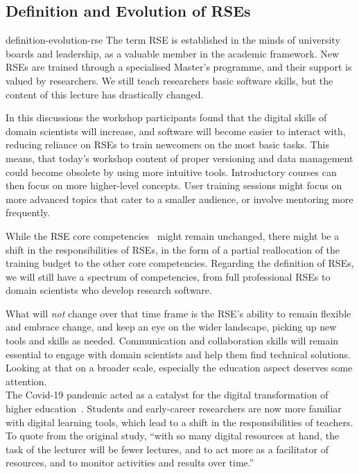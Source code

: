 \documentclass{eceasst}
\begin{document}
\subsection{Definition and Evolution of RSEs}
\begin{whatis}{}{definition-evolution-rse}
The term RSE is established in the minds of university boards and leadership, as a valuable member in the academic framework.
New RSEs are trained through a specialised Master's programme, and their support is valued by researchers.
We still teach researchers basic software skills, but the content of this lecture has drastically changed.
\end{whatis}
In this discussions the workshop participants found that
the digital skills of domain scientists will increase,
and software will become easier to interact with,
reducing reliance on RSEs to train newcomers on the most basic tasks.
This means, that today's workshop content of proper versioning
and data management could become obsolete by using more intuitive tools.
Introductory courses can then focus on more higher-level concepts.
User training sessions might focus on more advanced topics
that cater to a smaller audience, or involve mentoring more frequently.

While the RSE core competencies~\cite{Goth2024} might remain unchanged,
there might be a shift in the responsibilities of RSEs,
in the form of a partial reallocation of the training budget
to the other core competencies.
Regarding the definition of RSEs, we will still have a spectrum of competencies,
from full professional RSEs to domain scientists who develop research software.

What will \emph{not} change over that time frame is the RSE's ability to remain
flexible and embrace change, and keep an eye on the wider landscape,
picking up new tools and skills as needed.
Communication and collaboration skills will remain essential to engage
with domain scientists and help them find technical solutions.\\

Looking at that on a broader scale, especially the education aspect deserves some attention.\\
The Covid-19 pandemic acted as a catalyst for the digital transformation
of higher education~\cite{Bygstad2022}. Students and early-career researchers
are now more familiar with digital learning tools, which lead to a shift
in the responsibilities of teachers. To quote from the original study,
``with so many digital resources at hand,
the task of the lecturer will be fewer lectures,
and to act more as a facilitator of resources,
and to monitor activities and results over time.''~\cite{Bygstad2022}
\end{document}
